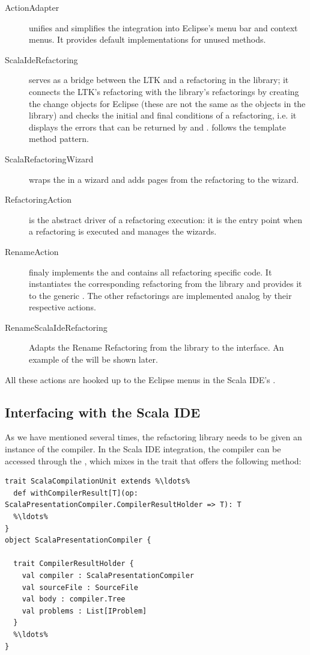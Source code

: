 \documentclass[10pt,a4paper,oneside]{scrreprt}
\begin{document}
\begin{description}
  \item[ActionAdapter] unifies and simplifies the integration into Eclipse's menu bar and context menus. It provides default implementations for unused methods.
  \item[ScalaIdeRefactoring] serves as a bridge between the LTK and a refactoring in the library; it connects the LTK's refactoring with the library's refactorings by creating the change objects for Eclipse (these are not the same as the  objects in the library) and checks the initial and final conditions of a refactoring, i.e. it displays the errors that can be returned by  and .  follows the template method pattern.
  \item[ScalaRefactoringWizard] wraps the  in a wizard and adds pages from the refactoring to the wizard.
  \item[RefactoringAction] is the abstract driver of a refactoring execution: it is the entry point when a refactoring is executed and manages the wizards.
  \item[RenameAction] finaly implements the  and contains all refactoring specific code. It instantiates the corresponding refactoring from the library and provides it to the generic . The other refactorings are implemented analog by their respective actions.
  \item[RenameScalaIdeRefactoring] Adapts the Rename Refactoring from the library to the  interface. An example of the  will be shown later.
\end{description}

All these actions are hooked up to the Eclipse menus in the Scala IDE's .

\subsection{Interfacing with the Scala IDE}

As we have mentioned several times, the refactoring library needs to be given an instance of the compiler. In the Scala IDE integration, the compiler can be accessed through the , which mixes in the  trait that offers the following method:

\begin{lstlisting}
trait ScalaCompilationUnit extends %\ldots%
  def withCompilerResult[T](op: ScalaPresentationCompiler.CompilerResultHolder => T): T
  %\ldots%
}
object ScalaPresentationCompiler {
  
  trait CompilerResultHolder {
    val compiler : ScalaPresentationCompiler
    val sourceFile : SourceFile
    val body : compiler.Tree
    val problems : List[IProblem]
  }
  %\ldots%
}
\end{lstlisting}
\end{document}

